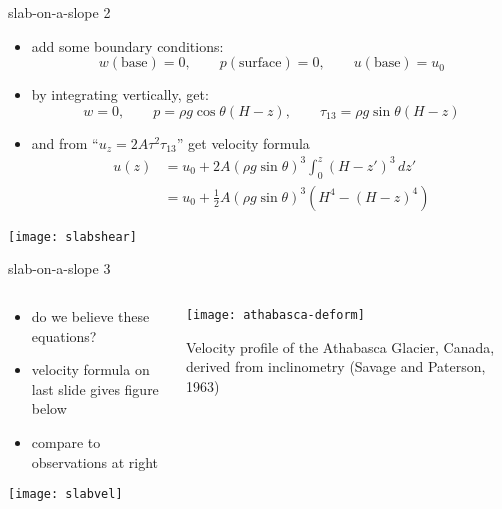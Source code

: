 \begin{frame}{slab-on-a-slope 2}

\begin{itemize}
\item add some boundary conditions:
	$$w(\text{base})=0, \qquad p(\text{surface})=0, \qquad u(\text{base})=u_0$$
\item by integrating vertically, get:
  $$w=0, \qquad p = \rho g \cos\theta (H-z), \qquad \tau_{13} = \rho g \sin\theta (H-z)$$
\item and from ``$u_z = 2 A \tau^2 \tau_{13}$'' get \alert{velocity formula}
\vspace{-0.05in}
\begin{align*}
u(z) &= u_0 + 2 A (\rho g \sin\theta)^3 \int_0^z (H-z')^3\,dz' \\
     &= u_0 + \frac{1}{2} A (\rho g \sin\theta)^3  \left(H^4 - (H-z)^4\right)
\end{align*}
\end{itemize}

\begin{center}
\texttt{[image: slabshear]}
\end{center}
\end{frame}


\begin{frame}{slab-on-a-slope 3}

\begin{columns}
\begin{column}{0.6\textwidth}
\begin{itemize}
\item do we believe these equations?
\item velocity formula on last slide gives figure below
\item compare to observations at right
\end{itemize}
\begin{center}
\texttt{[image: slabvel]}
\end{center}
\end{column}

\begin{column}{0.4\textwidth}
\texttt{[image: athabasca-deform]}

\medskip
\scriptsize
Velocity profile of the Athabasca Glacier, Canada, derived from inclinometry (Savage and Paterson, 1963)\nocite{SavagePaterson}
\end{column}
\end{columns}
\end{frame}


